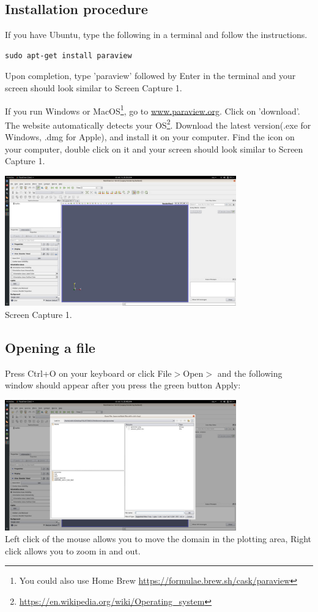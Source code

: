 
\subsection*{Installation procedure}

If you have Ubuntu, type the following in a terminal and follow the instructions. 
\begin{verbatim}
sudo apt-get install paraview
\end{verbatim}
Upon completion, type 'paraview' followed by Enter in the terminal and your screen should look similar to Screen Capture 1.

If you run Windows or MacOS\footnote{You could also use Home Brew 
\url{https://formulae.brew.sh/cask/paraview}}, go to \url{www.paraview.org}. 
Click on 'download'. The website automatically detects your 
OS\footnote{\url{https://en.wikipedia.org/wiki/Operating_system}}. 
Download the latest version(.exe for Windows, .dmg for Apple), and install it on your computer. 
Find the icon on your computer, double click on it and your screen should look similar to Screen Capture 1.

\begin{center}
\includegraphics[width=10cm]{images/paraview/p1}\\
{\captionfont Screen Capture 1.}
\end{center}

\subsection*{Opening a file}

Press Ctrl+O on your keyboard or click File$>$Open$>$ and the following window should appear after you press the 
green button Apply:

\begin{center}
\includegraphics[width=10cm]{images/paraview/p2}\\
{\captionfont Left click of the mouse allows you to move the domain in the plotting area, 
Right click allows you to zoom in and out.}
\end{center}

